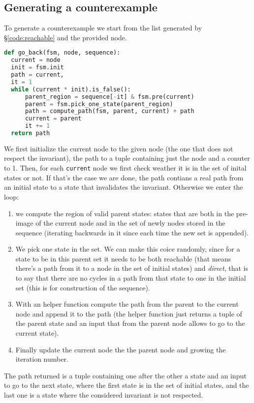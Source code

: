 \documentclass[9pt,oneside]{amsart}
\begin{document}
\begin{multicols}{2}
\section{Generating a counterexample}\label{back}
To generate a counterexample we start from the list generated by
\S\ref{code:reachable} and the provided node.
\begin{lstlisting}[language=Python]
def go_back(fsm, node, sequence):
  current = node
  init = fsm.init
  path = current,
  it = 1
  while (current * init).is_false():
      parent_region = sequence[-it] & fsm.pre(current)
      parent = fsm.pick_one_state(parent_region)
      path = compute_path(fsm, parent, current) + path
      current = parent
      it += 1
  return path
\end{lstlisting}
We first initialize the current node to the given node (the one that
does not respect the invariant), the path to a tuple containing just
the node and a conuter to 1. Then, for each \texttt{current} node we
first check weather it is in the set of inital states or not. If
that's the case we are done, the path contians a real path from an
initial state to a state that invalidates the invariant. Otherwise we
enter the loop:
\begin{enumerate}
\item we compute the region of valid parent states: states that are
  both in the pre-image of the current node and in the set of newly
  nodes stored in the sequence (iterating backwards in it since each
  time the new set is appended).
\item We pick one state in the set. We can make this coice randomly,
  since for a state to be in this parent set it needs to be both
  reachable (that means there's a path from it to a node in the set of
  initial states) and \textit{direct}, that is to say that there are
  no cycles in a path from that state to one in the initial set (this
  is for construction of the sequence).
\item With an helper function compute the path from the parent to the
  current node and append it to the path (the helper function just
  returns a tuple of the parent state and an input that from the
  parent node allows to go to the current state).
\item Finally update the current node the the parent node and growing
  the iteration number.
\end{enumerate}
The path returned is a tuple containing one after the other a state
and an input to go to the next state, where the first state is in the
set of initial states, and the last one is a state where the
considered invariant is not respected.
\end{multicols}
\end{document}
